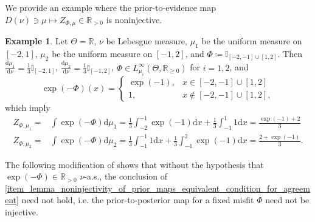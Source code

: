 \documentclass[a4paper]{scrartcl}
\theoremstyle{definition}
\newtheorem{example}[theorem]{Example}
\numberwithin{equation}{section}
\newcommand{\R}{\mathbb{R}}
\newcommand{\rd}{\mathrm{d}}
\begin{document}
We provide an example where the prior-to-evidence map $D(\nu)\ni\mu\mapsto Z_{\Phi,\mu}\in\R_{>0}$ is noninjective. 
\begin{example}
\label{example_prior_to_evidence}
 Let $\Theta=\R$, $\nu$ be Lebesgue measure, $\mu_1$ be the uniform measure on $[-2,1]$, $\mu_2$ be the uniform measure on $[-1,2]$, and 
$\Phi\coloneqq \mathbb{I}_{[-2,-1]\cup[1,2]}$. Then $\tfrac{\rd\mu_1}{\rd\nu}=\frac{1}{3}\mathbb{I}_{[-2,1]}$, $\tfrac{\rd\mu_2}{\rd\nu}=\frac{1}{3}\mathbb{I}_{[-1,2]}$, $\Phi\in L^\infty_{\mu_i}(\Theta,\R_{\geq 0})$ for $i=1,2$, and
\begin{equation*}
 \exp(-\Phi)(x)=\begin{cases}
              \exp(-1), & x\in[-2,-1]\cup [1,2]
              \\
              1, & x\notin [-2,-1]\cup [1,2],
             \end{cases}
\end{equation*}
 which imply
 \begin{align*}
  Z_{\Phi,\mu_1}=&\int \exp(-\Phi)\rd\mu_1=\frac{1}{3} \int_{-2}^{-1}\exp(-1) \rd x+\frac{1}{3}\int_{-1}^{1} 1 \rd x=\frac{\exp(-1)+2}{3}
  \\
  Z_{\Phi,\mu_2}=&\int \exp(-\Phi)\rd\mu_2= \frac{1}{3}\int_{-1}^{-1}1\rd x+\frac{1}{3}\int_{-1}^{2} \exp(-1) \rd x=\frac{2+\exp(-1)}{3}.
 \end{align*}
\end{example}
The following modification of  shows that without the hypothesis that $\exp(-\Phi)\in\R_{>0}$ $\nu$-a.s., the conclusion of \ref{item_lemma_noninjectivity_of_prior_maps_equivalent_condition_for_agreement} need not hold, i.e. the prior-to-posterior map for a fixed misfit $\Phi$ need not be injective.
\end{document}
